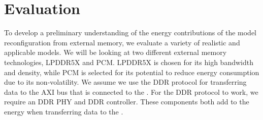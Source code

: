 \section{Evaluation}

To develop a preliminary understanding of the energy contributions of the model reconfiguration from external memory, we evaluate a variety of realistic and applicable models.
We will be looking at two different external memory technologies, LPDDR5X and PCM.
LPDDR5X is chosen for its high bandwidth and density, while PCM is selected for its potential to reduce energy consumption due to its non-volatility.
We assume we use the DDR protocol for transferring data to the AXI bus that is connected to the \graicore{}.
For the DDR protocol to work, we require an DDR PHY and DDR controller.
These components both add to the energy when transferring data to the \graicore{}.

